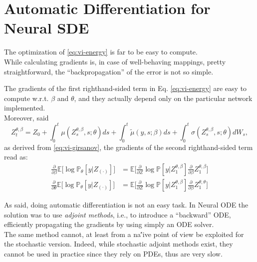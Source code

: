\documentclass[11pt]{article}
\begin{document}
\section{Automatic Differentiation for Neural SDE}
\label{sec:ad}
The optimization of \ref{eq:vi-energy} is far to be easy to compute. \\ 
While calculating gradients is, in case of well-behaving mappings, pretty straightforward, the ``backpropagation'' of the error is not so simple.

The gradients of the first righthand-sided term in Eq. \ref{eq:vi-energy} are easy to compute w.r.t. $\beta$ and $\theta$, and they actually depend only on the particular network implemented. \\ 
Moreover, said 
\begin{equation}
  Z_t^{\theta, \beta} = Z_0 + \int_0^t \mu(Z_s^{\theta, \beta}, s; \theta)ds + \int_0^t \tilde{\mu}(y, s; \beta)ds + \int_0^t \sigma(Z_s^{\theta, \beta}, s;\theta)dW_s,
\end{equation}
as derived from \ref{eq:vi-girsanov}, the gradients of the second righthand-sided term read as:
\begin{align}
  \frac{\partial}{\partial \beta} \mathbb{E}\big[ \log \mathbb{P}_\theta [y | Z_{(\cdot)}] \big] &= \mathbb{E}\bigg [ \frac{\partial}{\partial Z}\log \mathbb{P}[y | Z_1^{\theta, \beta}]\frac{\partial}{\partial \beta}Z_1^{\theta, \beta} \bigg] \\ 
  \frac{\partial}{\partial \theta} \mathbb{E}\big[ \log \mathbb{P}_\theta [y | Z_{(\cdot)}] \big] &= \mathbb{E}\bigg [ \frac{\partial}{\partial Z}\log \mathbb{P}[y | Z_1^{\theta, \beta}]\frac{\partial}{\partial \beta}Z_1^{\theta, \theta} \bigg]
\end{align}

As said, doing automatic differentiation is not an easy task.
In Neural ODE the solution was to use \textit{adjoint methods}, i.e., to introduce a ``backward'' ODE, efficiently propagating the gradients by using simply an ODE solver. \\ 
The same method cannot, at least from a na\''ive point of view be exploited for the stochastic version.
Indeed, while stochastic adjoint methods exist, they cannot be used in practice since they rely on PDEs, thus are very slow.  
\end{document}
